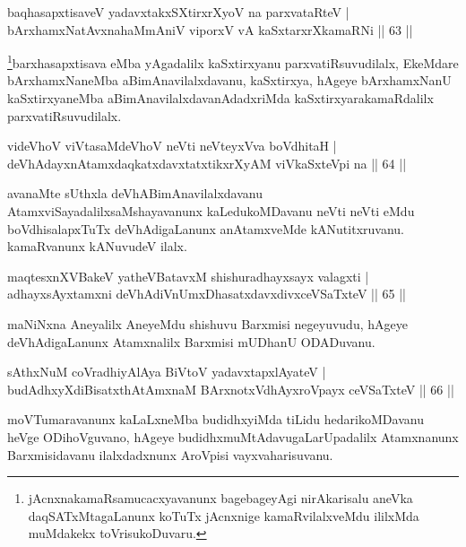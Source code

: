 \begin{shl}
baqhasapxtisaveV yadavxtakxSXtirxrXyoV na parxvataRteV |\\
bArxhamxNatAvxnahaMmAniV viporxV vA kaSxtarxrXkamaRNi \hfill || 63 ||
\end{shl}

\begin{artha}
\footnote{jAcnxnakamaRsamucacxyavanunx bagebageyAgi nirAkarisalu aneVka daqSATxMtagaLanunx koTuTx jAcnxnige kamaRvilalxveMdu ililxMda muMdakekx toVrisukoDuvaru.}barxhasapxtisava eMba yAgadalilx kaSxtirxyanu parxvatiRsuvudilalx, EkeMdare bArxhamxNaneMba aBimAnavilalxdavanu, kaSxtirxya, hAgeye bArxhamxNanU  kaSxtirxyaneMba aBimAnavilalxdavanAdadxriMda kaSxtirxyara\break kamaRdalilx parxvatiRsuvudilalx.
\end{artha}

\begin{shl}
videVhoV viVtasaMdeVhoV neVti neVteyxVva boVdhitaH |\\
deVhAdayxnAtamxdaqkatxdavxtatxtikxrXyAM viVkaSxteV\s pi na \hfill || 64 ||
\end{shl}

\begin{artha}
avanaMte sUthxla deVhABimAnavilalxdavanu AtamxviSayadalilx\break saMshayavanunx kaLedukoMDavanu neVti neVti eMdu boVdhisalapxTuTx deVhAdigaLanunx anAtamxveMde kANutitxruvanu. kamaRvanunx kANuvudeV ilalx.
\end{artha}

\begin{shl}
maqtesxnXVBakeV yatheVBatavxM shishuradhayxsayx valagxti |\\
adhayxsAyx\s \s tamxni deVhAdiVnUmxDhasatxdavxdivxceVSaTxteV \hfill || 65 ||
\end{shl}

\begin{artha}
maNiNxna Aneyalilx AneyeMdu shishuvu Barxmisi negeyuvudu, hAgeye deVhAdigaLanunx Atamxnalilx Barxmisi mUDhanU ODADuvanu.
\end{artha}

\begin{shl}
sAthxNuM coVradhiyA\s \s lAya BiVtoV yadavxtapxlAyateV |\\
budAdhxyXdiBisatxthA\s \s tAmxnaM BArxnotxV\s dhAyxroVpayx ceVSaTxteV \hfill || 66 ||
\end{shl}

\begin{artha}
moVTumaravanunx kaLaLxneMba budidhxyiMda tiLidu hedarikoMDavanu heVge ODihoVguvano, hAgeye budidhxmuMtAdavugaLa\break rUpadalilx Atamxnanunx Barxmisidavanu ilalxdadxnunx AroVpisi vayxvaharisuvanu.
\end{artha}

